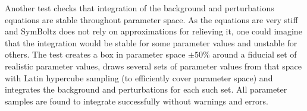 \documentclass{aa}
\begin{document}
Another test checks that integration of the background and perturbations equations are stable throughout parameter space.
As the equations are very stiff and SymBoltz does not rely on approximations for relieving it, one could imagine that the integration would be stable for some parameter values and unstable for others.
The test creates a box in parameter space $\pm 50\%$ around a fiducial set of realistic parameter values, draws several sets of parameter values from that space with Latin hypercube sampling (to efficiently cover parameter space) and integrates the background and perturbations for each such set.
All parameter samples are found to integrate successfully without warnings and errors.
\end{document}
